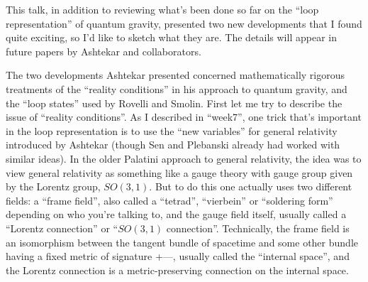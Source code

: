 \documentclass{article}
\begin{document}
This talk, in addition to reviewing what's been done so far on the
``loop representation'' of quantum gravity, presented two new
developments that I found quite exciting, so I'd like to sketch what
they are. The details will appear in future papers by Ashtekar and
collaborators.

The two developments Ashtekar presented concerned mathematically
rigorous treatments of the ``reality conditions'' in his approach to
quantum gravity, and the ``loop states'' used by Rovelli and Smolin.
First let me try to describe the issue of ``reality conditions''. As I
described in ``week7'', one trick that's important in the loop
representation is to use the ``new variables'' for general relativity
introduced by Ashtekar (though Sen and Plebanski already had worked with
similar ideas). In the older Palatini approach to general relativity,
the idea was to view general relativity as something like a gauge theory
with gauge group given by the Lorentz group, \(SO(3,1)\). But to do this
one actually uses two different fields: a ``frame field'', also called a
``tetrad'', ``vierbein'' or ``soldering form'' depending on who you're
talking to, and the gauge field itself, usually called a ``Lorentz
connection'' or ``\(SO(3,1)\) connection''. Technically, the frame field
is an isomorphism between the tangent bundle of spacetime and some other
bundle having a fixed metric of signature +---, usually called the
``internal space'', and the Lorentz connection is a metric-preserving
connection on the internal space.
\end{document}
